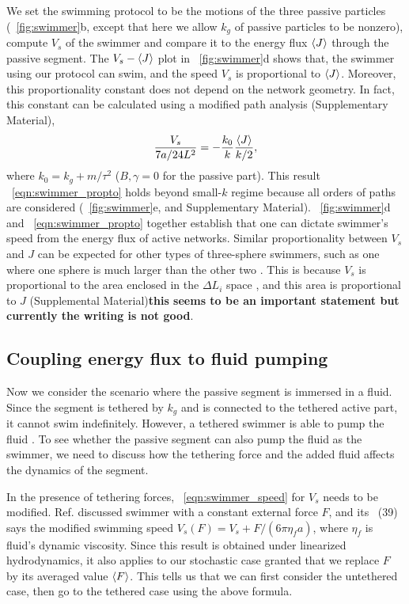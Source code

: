 \documentclass[
 preprint,
 preprintnumbers,
 amsmath,amssymb,
 aps,
 pre,
 longbibliography,
 superscriptaddress,
 10pt, twocolumn
]{revtex4-1}
\begin{document}
We set the swimming protocol to be the motions of the three passive particles (\figurename~\ref{fig:swimmer}b, except that here we allow $k_g$ of passive particles to be nonzero),
compute $V_s$ of the swimmer and compare it to the energy flux $\expval{J}$ through the passive segment.
The $V_s-\expval{J}$ plot in \figurename~\ref{fig:swimmer}d shows that, the swimmer using our protocol can swim, and the speed $V_s$ is proportional to $\expval{J}$. Moreover, this proportionality constant does not depend on the network geometry.
In fact, this constant can be calculated using a modified path analysis (Supplementary Material),
\begin{equation} \label{eqn:swimmer_propto}
    \frac{V_s}{7a/24L^2} = -\frac{k_0}{k} \frac{\expval{J}}{k/2},
\end{equation}
where $k_0 = k_g + m/\tau^2$ ($B,\gamma=0$ for the passive part).
This result \eqnname~\eqref{eqn:swimmer_propto} holds beyond small-$k$ regime because all orders of paths are considered (\figurename~\ref{fig:swimmer}e, and Supplementary Material).
\figurename~\ref{fig:swimmer}d and \eqnname~\eqref{eqn:swimmer_propto} together establish that one can dictate swimmer's speed from the energy flux of active networks.
Similar proportionality between $V_s$ and $J$ can be expected for other types of three-sphere swimmers, such as one where one sphere is much larger than the other two \cite{Golestanian2008ThreesphereLowReynoldsnumber}. This is because $V_s$ is proportional to the area enclosed in the $\Delta L_i$ space \cite{Golestanian2009StochasticLow}, and this area is proportional to $J$ (Supplemental Material){\bf this seems to be an important statement but currently the writing is not good}.

\subsection{Coupling energy flux to fluid pumping}
Now we consider the scenario where the passive segment is immersed in a fluid. Since the segment is tethered by $k_g$ and is connected to the tethered active part, it cannot swim indefinitely. However, a tethered swimmer is able to pump the fluid \cite{Leoni2009BasicSwimmer}. To see whether the passive segment can also pump the fluid as the swimmer, we need to discuss how the tethering force and the added fluid affects the dynamics of the segment.

In the presence of tethering forces, \eqnname~\eqref{eqn:swimmer_speed} for $V_s$ needs to be modified.
Ref. \cite{Golestanian2008AnalyticResults} discussed swimmer with a constant external force $F$, and its \eqnname~(39) says the modified swimming speed $V_s(F) = V_s + F/(6\pi\eta_f a)$, where $\eta_f$ is fluid's dynamic viscosity.
Since this result is obtained under linearized hydrodynamics, it also applies to our stochastic case granted that we replace $F$ by its averaged value $\expval{F}$.
This tells us that we can first consider the untethered case, then go to the tethered case using the above formula.
\end{document}
